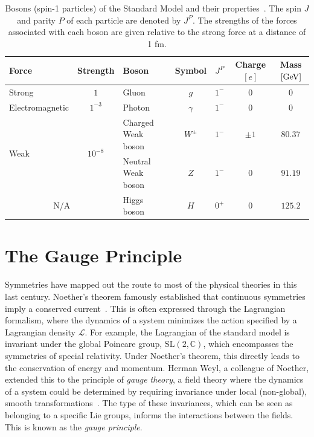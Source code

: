 \begin{table}[h]
	\centering
	\caption{Bosons (spin-1 particles) of the Standard Model and their properties~\cite{ParticleDataGroup}.
		The spin $J$ and parity $P$ of each particle are denoted by $J^P$. The strengths of the forces associated with each boson are given relative to the strong force at a distance of 1 \unit{\femto\metre}.}
	\begin{adjustbox}{max width=\textwidth}
		\label{tab:bosons}
		\renewcommand{\arraystretch}{1.5}
		\begin{tabular}{lclcccc}
			\toprule
			\hline
			Force                   & Strength                   & Boson              & Symbol   & $J^P$ & Charge $[e]$ & Mass $[\GeV]$ \\
			\hline
			Strong                  & $1$                        & Gluon              & $g$      & $1^-$ & 0            & 0             \\
			Electromagnetic         & $1^{-3}$                   & Photon             & $\gamma$ & $1^-$ & 0            & 0             \\
			\multirow{2}{*}{Weak}   & \multirow{2}{*}{$10^{-8}$} & Charged Weak boson & $W^\pm$  & $1^-$ & $\pm 1$      & $80.37$       \\
			                        &                            & Neutral Weak boson & $Z$      & $1^-$ & 0            & $91.19$       \\
			\multicolumn{2}{c}{N/A} & Higgs boson                & $H$                & $0^+$    & 0     & $125.2$                      \\
			\hline
		\end{tabular}
	\end{adjustbox}
\end{table}

\section{The Gauge Principle}
\label{sec:gauge_principle}

Symmetries have mapped out the route to most of the physical theories in this last century.
Noether's theorem famously established that continuous symmetries imply a conserved current~\cite{noether1918}.
This is often expressed through the Lagrangian formalism, where the dynamics of a system minimizes the action specified by a Lagrangian density $\mathcal{L}$.
For example, the Lagrangian of the standard model is invariant under the global Poincare group, $\text{SL}(2, \mathbb{C})$, which encompasses the symmetries of special relativity.
Under Noether's theorem, this directly leads to the conservation of energy and momentum.
Herman Weyl, a colleague of Noether, extended this to the principle of \textit{gauge theory}, a field theory where the dynamics of a system could be determined by requiring invariance under local (non-global), smooth transformations~\cite{weyl1918}.
The type of these invariances, which can be seen as belonging to a specific Lie groups, informs the interactions between the fields.
This is known as the \textit{gauge principle}.

